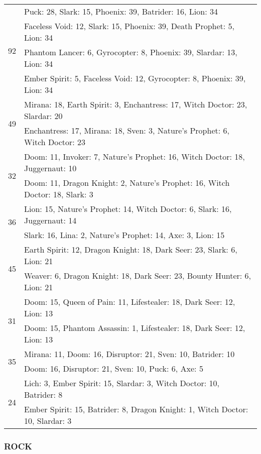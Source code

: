 \begin{table}[H]
\begin{tabular}{ | c | p{12.5cm} | }
\hline
\multirow{4}{*}{92}
& Puck: 28, Slark: 15, Phoenix: 39, Batrider: 16, Lion: 34 \\
& Faceless Void: 12, Slark: 15, Phoenix: 39, Death Prophet: 5, Lion: 34 \\
& Phantom Lancer: 6, Gyrocopter: 8, Phoenix: 39, Slardar: 13, Lion: 34 \\
& Ember Spirit: 5, Faceless Void: 12, Gyrocopter: 8, Phoenix: 39, Lion: 34 \\
\hline
\multirow{2}{*}{49}
& Mirana: 18, Earth Spirit: 3, Enchantress: 17, Witch Doctor: 23, Slardar: 20 \\
& Enchantress: 17, Mirana: 18, Sven: 3, Nature's Prophet: 6, Witch Doctor: 23 \\
\hline
\multirow{2}{*}{32}
& Doom: 11, Invoker: 7, Nature's Prophet: 16, Witch Doctor: 18, Juggernaut: 10 \\
& Doom: 11, Dragon Knight: 2, Nature's Prophet: 16, Witch Doctor: 18, Slark: 3 \\
\hline
\multirow{2}{*}{36}
& Lion: 15, Nature's Prophet: 14, Witch Doctor: 6, Slark: 16, Juggernaut: 14 \\
& Slark: 16, Lina: 2, Nature's Prophet: 14, Axe: 3, Lion: 15 \\
\hline
\multirow{2}{*}{45}
& Earth Spirit: 12, Dragon Knight: 18, Dark Seer: 23, Slark: 6, Lion: 21 \\
& Weaver: 6, Dragon Knight: 18, Dark Seer: 23, Bounty Hunter: 6, Lion: 21 \\
\hline
\multirow{2}{*}{31}
& Doom: 15, Queen of Pain: 11, Lifestealer: 18, Dark Seer: 12, Lion: 13 \\
& Doom: 15, Phantom Assassin: 1, Lifestealer: 18, Dark Seer: 12, Lion: 13 \\
\hline
\multirow{2}{*}{35}
& Mirana: 11, Doom: 16, Disruptor: 21, Sven: 10, Batrider: 10 \\
& Doom: 16, Disruptor: 21, Sven: 10, Puck: 6, Axe: 5 \\
\hline
\multirow{2}{*}{24}
& Lich: 3, Ember Spirit: 15, Slardar: 3, Witch Doctor: 10, Batrider: 8 \\
& Ember Spirit: 15, Batrider: 8, Dragon Knight: 1, Witch Doctor: 10, Slardar: 3 \\
\hline
    \end{tabular}
    \caption{}
    \label{}
    \end{table}

\subsubsection*{ROCK}

